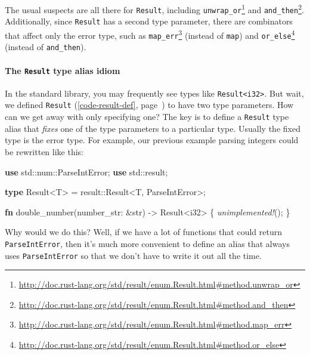 \documentclass[a4paper,]{book}
\renewcommand*{\hypertarget}[3][\ar]{%
  \def\ar{#2}%
  \label{#1}%
  #3}
\renewcommand*{\hyperlink}[2]{%
 #2 (\autoref{#1}, page~\pageref{#1})}
\newenvironment{Shaded}{\begin{snugshade}}{\end{snugshade}}
\newcommand{\KeywordTok}[1]{\textcolor[rgb]{0.13,0.29,0.53}{\textbf{{#1}}}}
\newcommand{\DataTypeTok}[1]{\textcolor[rgb]{0.13,0.29,0.53}{{#1}}}
\newcommand{\PreprocessorTok}[1]{\textcolor[rgb]{0.56,0.35,0.01}{\textit{{#1}}}}
\newcommand{\NormalTok}[1]{{#1}}
\renewcommand{\href}[2]{#2\footnote{\url{#1}}}
\let\oldparagraph\paragraph
\renewcommand{\paragraph}[1]{\oldparagraph{#1}\mbox{}}
\begin{document}
The usual suspects are all there for \texttt{Result}, including
\href{http://doc.rust-lang.org/std/result/enum.Result.html\#method.unwrap_or}{\texttt{unwrap\_or}}
and
\href{http://doc.rust-lang.org/std/result/enum.Result.html\#method.and_then}{\texttt{and\_then}}.
Additionally, since \texttt{Result} has a second type parameter, there
are combinators that affect only the error type, such as
\href{http://doc.rust-lang.org/std/result/enum.Result.html\#method.map_err}{\texttt{map\_err}}
(instead of \texttt{map}) and
\href{http://doc.rust-lang.org/std/result/enum.Result.html\#method.or_else}{\texttt{or\_else}}
(instead of \texttt{and\_then}).

\hypertarget{the-result-type-alias-idiom}{\paragraph{\texorpdfstring{The
\texttt{Result} type alias
idiom}{The Result type alias idiom}}\label{the-result-type-alias-idiom}}

In the standard library, you may frequently see types like
\texttt{Result\textless{}i32\textgreater{}}. But wait,
\protect\hyperlink{code-result-def}{we defined \texttt{Result}} to have
two type parameters. How can we get away with only specifying one? The
key is to define a \texttt{Result} type alias that \emph{fixes} one of
the type parameters to a particular type. Usually the fixed type is the
error type. For example, our previous example parsing integers could be
rewritten like this:

\begin{Shaded}
\begin{Highlighting}[]
\KeywordTok{use} \NormalTok{std::num::ParseIntError;}
\KeywordTok{use} \NormalTok{std::result;}

\KeywordTok{type} \NormalTok{Result<T> = result::}\DataTypeTok{Result}\NormalTok{<T, ParseIntError>;}

\KeywordTok{fn} \NormalTok{double_number(number_str: &}\DataTypeTok{str}\NormalTok{) -> }\DataTypeTok{Result}\NormalTok{<}\DataTypeTok{i32}\NormalTok{> \{}
    \PreprocessorTok{unimplemented!}\NormalTok{();}
\NormalTok{\}}
\end{Highlighting}
\end{Shaded}

Why would we do this? Well, if we have a lot of functions that could
return \texttt{ParseIntError}, then it's much more convenient to define
an alias that always uses \texttt{ParseIntError} so that we don't have
to write it out all the time.
\end{document}
